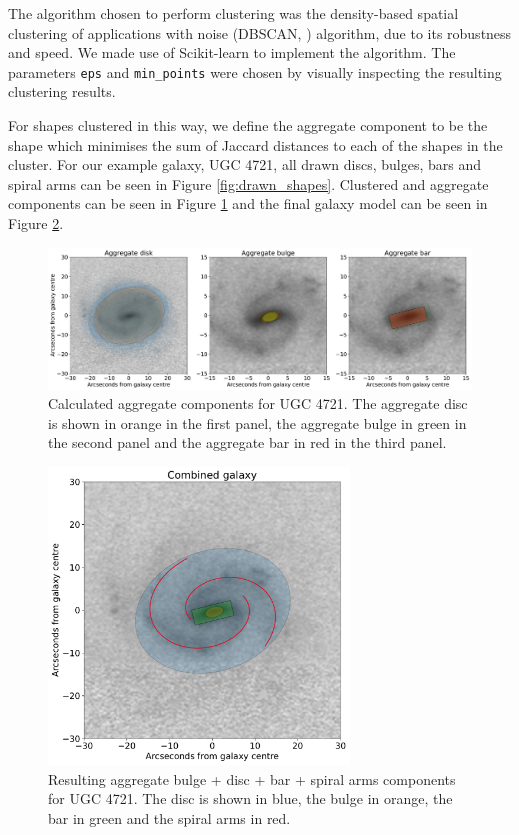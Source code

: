 \documentclass[../main.tex]{subfiles}
\begin{document}
The algorithm chosen to perform clustering was the density-based spatial clustering of applications with noise (DBSCAN, \citealt{dbscan}) algorithm, due to its robustness and speed. We made use of Scikit-learn \citep{scikit-learn} to implement the algorithm. The parameters \texttt{eps} and \texttt{min\_points} were chosen by visually inspecting the resulting clustering results.

For shapes clustered in this way, we define the aggregate component to be the shape which minimises the sum of Jaccard distances to each of the shapes in the cluster. For our example galaxy, UGC 4721, all drawn discs, bulges, bars and spiral arms can be seen in Figure \ref{fig:drawn_shapes}. Clustered and aggregate components can be seen in Figure \ref{fig:mean_shapes} and the final galaxy model can be seen in Figure \ref{fig:aggregate_model}.

\begin{figure}
  \includegraphics[width=17.3cm]{images__method/mean_shapes.pdf}
  \caption{Calculated aggregate components for UGC 4721. The aggregate disc is shown in orange in the first panel, the aggregate bulge in green in the second panel and the aggregate bar in red in the third panel.}
  \label{fig:mean_shapes}
\end{figure}


\begin{figure}
  \includegraphics[width=8cm]{images__method/aggregate_model.pdf}
  \caption{Resulting aggregate bulge + disc + bar + spiral arms components for UGC 4721. The disc is shown in blue, the bulge in orange, the bar in green and the spiral arms in red.}
  \label{fig:aggregate_model}
\end{figure}
\end{document}
